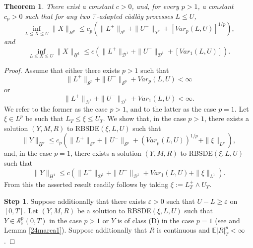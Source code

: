 \documentclass[11pt,a4paper,reqno]{amsart}
\newtheorem{theorem}{\bf Theorem}[section]
\theoremstyle{definition}
\numberwithin{equation}{section}
\begin{document}
\begin{theorem}
\label{th.main}
There exist  a constant  $c>0$, and, for every $p>1$, a constant  $c_p>0$ such that for any two  
$\mathbb F$-adapted c\`adl\`ag processes $L\le U$,
\begin{equation}
\label{eq.semn}
\inf_{L\leq X\leq U}\|X\|_{\underline H^p}
\le c_p\left(
\|L^+\|_{\mathcal S^p}
+\|U^-\|_{\mathcal S^p}
+[Var_p(L,U)]^{1/p}\right),
\end{equation}
and
\begin{equation}
\label{eq.semn11}
\inf_{L\leq X\leq U}\|X\|_{\underline H^1}
\le c
\left(\|L^+\|_{\mathcal D^1}+\|U^-\|_{\mathcal D^1}+[Var_1(L,U)]\right).
\end{equation}
\end{theorem}
\begin{proof}
Assume that either there exists $p>1$ such that 
\begin{equation}
\label{eq.lulu1}
\|L^+\|_{\mathcal S^p}+\|U^-\|_{\mathcal S^p}+Var_p(L,U)<\infty
\end{equation}
or 
\begin{equation}
\label{eq.lulu2}
\|L^+\|_{\mathcal D^1}+\|U^-\|_{\mathcal D^1}+ Var_1(L,U)<\infty.
\end{equation} 
We refer to the former as the case $p>1$, and to the latter as the case $p=1$.
Let   $\xi\in L^p$ be  such that   $L_T\le \xi\le U_T$.
We show that, in the case $p>1$, there exists a 
solution $(Y,M,R)$ to RBSDE$(\xi,L,U)$ such that 
\begin{equation}
\label{eq.ass1}
\|Y\|_{\underline H^p}\le c_p( \|L^+\|_{\mathcal S^p}+\|U^-\|_{\mathcal S^p}+ (Var_p(L,U))^{1/p}+\|\xi\|_{L^p}),
\end{equation}
and, in the case $p=1$,  there exists a solution $(Y,M,R)$ to RBSDE$(\xi,L,U)$  such that 
\begin{equation}
\label{eq.ass111}
\|Y\|_{\underline H^1}\le  c(\|L^+\|_{\mathcal D^1}+\|U^-\|_{\mathcal D^1}+ Var_1(L,U)+\|\xi\|_{L^1}).
\end{equation}
From this the asserted result readily follows by taking $\xi:= L^+_T\wedge U_T$.

{\bf Step 1}. Suppose additionally that there exists $\varepsilon>0$ such that $U-L\ge \varepsilon$
on $[0,T]$. 
Let $(Y,M,R)$ be a solution to RBSDE$(\xi,L,U)$
such that $Y\in\mathcal S^p_{\mathbb{F}}(0,T)$ in the case $p>1$ or $Y$ is of class \textnormal{(D)} in the case $p=1$
(see \cite[Proposition A.7, Remark A.8]{K:SPA2} and Lemma \ref{24marca1}). 
Suppose additionally that $R$ is continuous and $\mathbb E|R|^p_T<\infty$. 


\end{proof}
\end{document}
